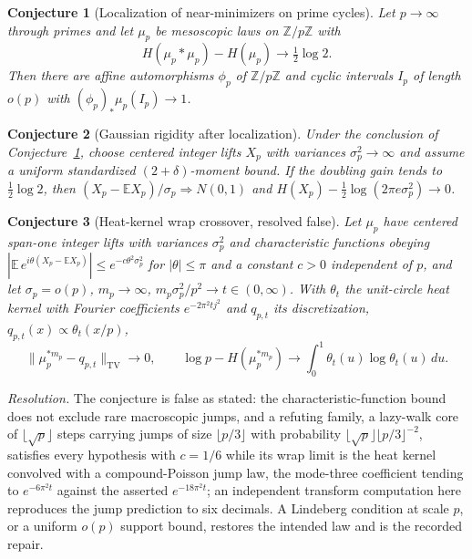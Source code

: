 \documentclass[11pt]{article}
\newtheorem{conjecture}{Conjecture}
\theoremstyle{definition}
\begin{document}
\begin{conjecture}[Localization of near-minimizers on prime cycles]\label{ac11}
Let $p\to\infty$ through primes and let $\mu_p$ be mesoscopic laws on $\mathbb Z/p\mathbb Z$ with
\[
H(\mu_p*\mu_p)-H(\mu_p)\to\tfrac12\log2.
\]
Then there are affine automorphisms $\phi_p$ of $\mathbb Z/p\mathbb Z$ and cyclic intervals $I_p$ of length $o(p)$ with $(\phi_p)_*\mu_p(I_p)\to1$.
\end{conjecture}

\begin{conjecture}[Gaussian rigidity after localization]\label{ac12}
Under the conclusion of Conjecture~\ref{ac11}, choose centered integer lifts $X_p$ with variances $\sigma_p^2\to\infty$ and assume a uniform standardized $(2+\delta)$-moment bound.  If the doubling gain tends to $\tfrac12\log2$, then $(X_p-\mathbb EX_p)/\sigma_p\Rightarrow N(0,1)$ and $H(X_p)-\tfrac12\log(2\pi e\sigma_p^2)\to0$.
\end{conjecture}

\begin{conjecture}[Heat-kernel wrap crossover, resolved false]\label{ac13}
Let $\mu_p$ have centered span-one integer lifts with variances $\sigma_p^2$ and characteristic functions obeying $|\mathbb E\,e^{i\theta(X_p-\mathbb EX_p)}|\le e^{-c\theta^2\sigma_p^2}$ for $|\theta|\le\pi$ and a constant $c>0$ independent of $p$, and let $\sigma_p=o(p)$, $m_p\to\infty$, $m_p\sigma_p^2/p^2\to t\in(0,\infty)$.  With $\theta_t$ the unit-circle heat kernel with Fourier coefficients $e^{-2\pi^2tj^2}$ and $q_{p,t}$ its discretization, $q_{p,t}(x)\propto\theta_t(x/p)$,
\[
\|\mu_p^{*m_p}-q_{p,t}\|_{\mathrm{TV}}\to0,\qquad
\log p-H(\mu_p^{*m_p})\to\int_0^1\theta_t(u)\log\theta_t(u)\,du.
\]
\end{conjecture}

\emph{Resolution.}  The conjecture is false as stated: the characteristic-function bound does not exclude rare macroscopic jumps, and a refuting family, a lazy-walk core of $\lfloor\sqrt p\rfloor$ steps carrying jumps of size $\lfloor p/3\rfloor$ with probability $\lfloor\sqrt p\rfloor\lfloor p/3\rfloor^{-2}$, satisfies every hypothesis with $c=1/6$ while its wrap limit is the heat kernel convolved with a compound-Poisson jump law, the mode-three coefficient tending to $e^{-6\pi^2t}$ against the asserted $e^{-18\pi^2t}$; an independent transform computation here reproduces the jump prediction to six decimals.  A Lindeberg condition at scale $p$, or a uniform $o(p)$ support bound, restores the intended law and is the recorded repair.
\end{document}
